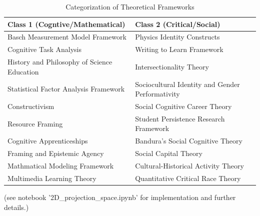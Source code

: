 \begin{table}[h!]
\centering
\caption{Categorization of Theoretical Frameworks}
\begin{tabular}{|p{7cm}|p{7cm}|}
\hline
\textbf{Class 1 (Cogntive/Mathematical)} & \textbf{Class 2 (Critical/Social)} \\
\hline
Basch Measurement Model Framework & Physics Identity Constructs \\
Cognitive Task Analysis & Writing to Learn Framework \\
History and Philosophy of Science Education & Intersectionality Theory \\
Statistical Factor Analysis Framework & Sociocultural Identity and Gender Performativity \\
Constructivism & Social Cognitive Career Theory \\
Resource Framing & Student Persistence Research Framework \\
Cognitive Apprenticeships & Bandura's Social Cognitive Theory \\
Framing and Epistemic Agency & Social Capital Theory \\
Mathmatical Modeling Framework & Cultural-Historical Activity Theory \\
Multimedia Learning Theory & Quantitative Critical Race Theory \\
\hline
\end{tabular}
\label{tab:111}
\end{table}
\noindent (see notebook '2D\_projection\_space.ipynb' for implementation and further details.)
